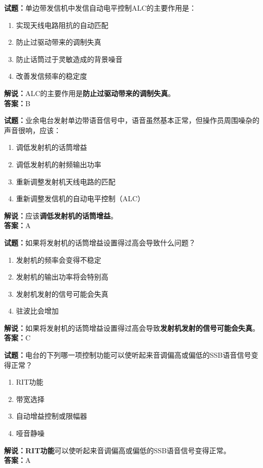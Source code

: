 \documentclass{ctexbook}
\begin{document}
\bigskip


\noindent\textbf{试题：}单边带发信机中发信自动电平控制ALC的主要作用是：
\begin{enumerate}[leftmargin=3em]
\item 实现天线电路阻抗的自动匹配
\item 防止过驱动带来的调制失真
\item 防止话筒过于灵敏造成的背景噪音
\item 改善发信频率的稳定度
\end{enumerate}
\noindent\textbf{解说：}ALC的主要作用是\textbf{防止过驱动带来的调制失真}。\\\noindent\textbf{答案：}B




\bigskip


\noindent\textbf{试题：}业余电台发射单边带语音信号中，语音虽然基本正常，但操作员周围噪杂的声音很响，应该：
\begin{enumerate}[leftmargin=3em]
\item 调低发射机的话筒增益
\item 调低发射机的射频输出功率
\item 重新调整发射机天线电路的匹配
\item 重新调整发信机的自动电平控制（ALC）
\end{enumerate}
\noindent\textbf{解说：}应该\textbf{调低发射机的话筒增益}。\\\noindent\textbf{答案：}A




\bigskip


\noindent\textbf{试题：}如果将发射机的话筒增益设置得过高会导致什么问题？
\begin{enumerate}[leftmargin=3em]
\item 发射机的频率会变得不稳定
\item 发射机的输出功率将会特别高
\item 发射机发射的信号可能会失真
\item 驻波比会增加
\end{enumerate}
\noindent\textbf{解说：}如果将发射机的话筒增益设置得过高会导致\textbf{发射机发射的信号可能会失真}。\\\noindent\textbf{答案：}C



\bigskip


\noindent\textbf{试题：}电台的下列哪一项控制功能可以使听起来音调偏高或偏低的SSB语音信号变得正常？
\begin{enumerate}[leftmargin=3em]
\item RIT功能
\item 带宽选择
\item 自动增益控制或限幅器
\item 哑音静噪
\end{enumerate}
\noindent\textbf{解说：}\textbf{RIT功能}可以使听起来音调偏高或偏低的SSB语音信号变得正常。\\\noindent\textbf{答案：}A
\end{document}

